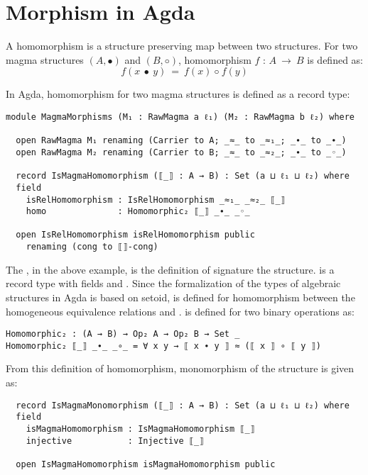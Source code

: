\section{Morphism in Agda}
A homomorphism is a structure preserving map between two structures.  For two
magma structures $(A,∙)$ and $(B,◦)$, homomorphism  \(f\) : \(A \ \rightarrow
\ B\) is defined as:
\[f(x\  ∙ \  y) \ = \ f(x) \ ◦ \  f(y)\] 

In Agda, homomorphism for two magma structures is defined as a record type:

\begin{verbatim}
module MagmaMorphisms (M₁ : RawMagma a ℓ₁) (M₂ : RawMagma b ℓ₂) where

  open RawMagma M₁ renaming (Carrier to A; _≈_ to _≈₁_; _∙_ to _∙_)
  open RawMagma M₂ renaming (Carrier to B; _≈_ to _≈₂_; _∙_ to _◦_)

  record IsMagmaHomomorphism (⟦_⟧ : A → B) : Set (a ⊔ ℓ₁ ⊔ ℓ₂) where
  field
    isRelHomomorphism : IsRelHomomorphism _≈₁_ _≈₂_ ⟦_⟧
    homo              : Homomorphic₂ ⟦_⟧ _∙_ _◦_

  open IsRelHomomorphism isRelHomomorphism public
    renaming (cong to ⟦⟧-cong)
\end{verbatim}

The , in the above example,  is the
definition of signature the structure.  is a record
type with fields  and . Since the
formalization of the types of algebraic structures in Agda is based on setoid,
 is defined for homomorphism between the homogeneous
equivalence relations  and .  is
defined for two binary operations as:

\begin{verbatim}
Homomorphic₂ : (A → B) → Op₂ A → Op₂ B → Set _
Homomorphic₂ ⟦_⟧ _∙_ _∘_ = ∀ x y → ⟦ x ∙ y ⟧ ≈ (⟦ x ⟧ ∘ ⟦ y ⟧)
\end{verbatim}

From this definition of homomorphism, monomorphism of the structure is given as:

\begin{verbatim}
  record IsMagmaMonomorphism (⟦_⟧ : A → B) : Set (a ⊔ ℓ₁ ⊔ ℓ₂) where
  field
    isMagmaHomomorphism : IsMagmaHomomorphism ⟦_⟧
    injective           : Injective ⟦_⟧

  open IsMagmaHomomorphism isMagmaHomomorphism public
\end{verbatim}

